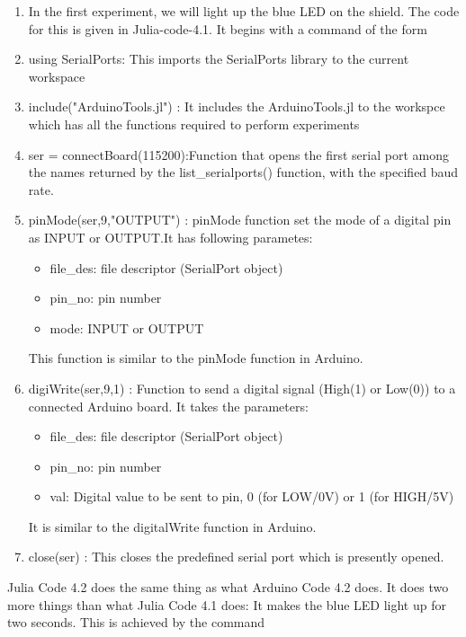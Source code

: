 \begin{enumerate}
  \item In the first experiment, we will light up the blue LED on the
        shield.  The code for this is given in Julia-code-4.1.
        It begins with a command of the form
        
  \item using SerialPorts: This imports the SerialPorts library to the current workspace
  \item include("ArduinoTools.jl") : It includes the ArduinoTools.jl to the workspce which has all the functions required to perform experiments
  \item ser = connectBoard(115200):Function that opens the first serial port among the names returned by the
        list\_serialports() function, with the specified baud rate.
        
  \item pinMode(ser,9,"OUTPUT") : pinMode function set the mode of a digital pin as INPUT or OUTPUT.It has following parametes:
        \begin{itemize}
          \item file\_des: file descriptor (SerialPort object)
          \item pin\_no: pin number
          \item mode: INPUT or OUTPUT
        \end{itemize}
        This function is similar to the pinMode function in Arduino.
        
        
  \item digiWrite(ser,9,1) : Function to send a digital signal (High(1) or Low(0)) to a connected Arduino
        board. It takes the parameters:
        
        \begin{itemize}
          \item file\_des: file descriptor (SerialPort object)
          \item pin\_no: pin number
          \item val: Digital value to be sent to pin, 0 (for LOW/0V) or 1 (for HIGH/5V)
        \end{itemize}
        It is similar to the digitalWrite function in Arduino.
        
  \item close(ser) : This closes the predefined serial port which is presently opened.
\end{enumerate}

Julia Code 4.2 does the same thing as what Arduino Code 4.2 does. It does
two more things than what Julia Code 4.1 does: It makes the blue LED light
up for two seconds. This is achieved by the command

